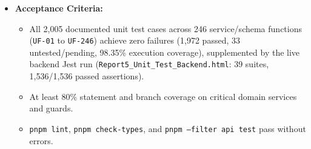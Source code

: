 \documentclass[12pt,a4paper]{article}
\begin{document}
\begin{itemize}
  \item \textbf{Acceptance Criteria:}
  \begin{itemize}
    \item All 2,005 documented unit test cases across 246 service/schema functions (\texttt{UF-01} to \texttt{UF-246}) achieve zero failures (1,972 passed, 33 untested/pending, 98.35\% execution coverage), supplemented by the live backend Jest run (\texttt{Report5\_Unit\_Test\_Backend.html}: 39 suites, 1,536/1,536 passed assertions).
    \item At least 80\% statement and branch coverage on critical domain services and guards.
    \item \texttt{pnpm lint}, \texttt{pnpm check-types}, and \texttt{pnpm --filter api test} pass without errors.
  \end{itemize}
\end{itemize}
\end{document}
